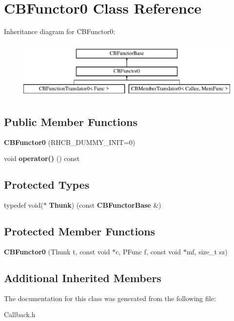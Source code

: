 \section{C\+B\+Functor0 Class Reference}
\label{classCBFunctor0}
Inheritance diagram for C\+B\+Functor0\+:\begin{figure}[H]
\begin{center}
\leavevmode
\includegraphics[height=3.000000cm]{classCBFunctor0}
\end{center}
\end{figure}
\subsection*{Public Member Functions}
\begin{DoxyCompactItemize}
\item 
{\bfseries C\+B\+Functor0} (R\+H\+C\+B\+\_\+\+D\+U\+M\+M\+Y\+\_\+\+I\+N\+IT=0)\label{classCBFunctor0_aa261471abb59323a151f573e50ab389c}

\item 
void {\bfseries operator()} () const \label{classCBFunctor0_a202aaeb45c6bfeaf12d2c41da3196a4c}

\end{DoxyCompactItemize}
\subsection*{Protected Types}
\begin{DoxyCompactItemize}
\item 
typedef void($\ast$ {\bfseries Thunk}) (const {\bf C\+B\+Functor\+Base} \&)\label{classCBFunctor0_a8cf13cb7f7b9e28615f907a8fed82156}

\end{DoxyCompactItemize}
\subsection*{Protected Member Functions}
\begin{DoxyCompactItemize}
\item 
{\bfseries C\+B\+Functor0} (Thunk t, const void $\ast$c, P\+Func f, const void $\ast$mf, size\+\_\+t sz)\label{classCBFunctor0_af657992d8a4b03d924f9158f6736efd4}

\end{DoxyCompactItemize}
\subsection*{Additional Inherited Members}


The documentation for this class was generated from the following file\+:\begin{DoxyCompactItemize}
\item 
Callback.\+h\end{DoxyCompactItemize}
